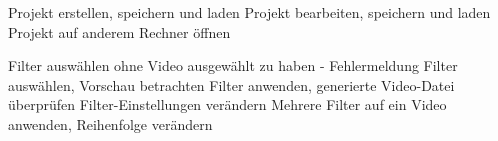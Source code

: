 %

 Projekt erstellen, speichern und laden
 Projekt bearbeiten, speichern und laden
 Projekt auf anderem Rechner öffnen

 Filter auswählen ohne Video ausgewählt zu haben - Fehlermeldung
 Filter auswählen, Vorschau betrachten
 Filter anwenden, generierte Video-Datei überprüfen
 Filter-Einstellungen verändern
 Mehrere Filter auf ein Video anwenden, Reihenfolge verändern

